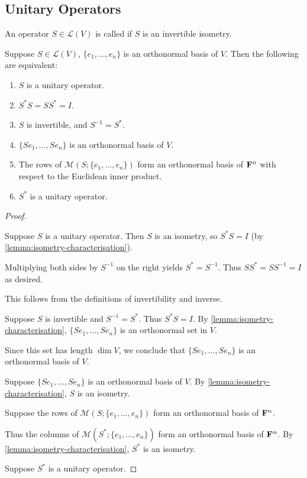 \subsection{Unitary Operators}
\begin{definition}
An operator $S\in\mathcal{L}(V)$ is called  if $S$ is an invertible isometry.
\end{definition}

\begin{lemma}\label{lemma:unitary-operator-characterisation}
Suppose $S\in\mathcal{L}(V)$, $\{e_1,\dots,e_n\}$ is an orthonormal basis of $V$. Then the following are equivalent:
\begin{enumerate}[label=(\roman*)]
\item $S$ is a unitary operator.
\item $S^*S=SS^*=I$.
\item $S$ is invertible, and $S^{-1}=S^*$.
\item $\{Se_1,\dots,Se_n\}$ is an orthonormal basis of $V$.
\item The rows of $\mathcal{M}(S;\{e_1,\dots,e_n\})$ form an orthonormal basis of $\mathbf F^n$ with respect to the Euclidean inner product.
\item $S^*$ is a unitary operator.
\end{enumerate}
\end{lemma}

\begin{proof} \

 Suppose $S$ is a unitary operator. Then $S$ is an isometry, so $S^*S=I$ (by \ref{lemma:isometry-characterisation}). 

Multiplying both sides by $S^{-1}$ on the right yields $S^*=S^{-1}$. Thus $SS^*=SS^{-1}=I$ as desired.

 This follows from the definitions of invertibility and inverse.

 Suppose $S$ is invertible and $S^{-1}=S^*$. Thus $S^*S=I$. By \ref{lemma:isometry-characterisation}, $\{Se_1,\dots,Se_n\}$ is an orthonormal set in $V$. 

Since this set has length $\dim V$, we conclude that $\{Se_1,\dots,Se_n\}$ is an orthonormal basis of $V$.

 Suppose $\{Se_1,\dots,Se_n\}$ is an orthonormal basis of $V$.
By \ref{lemma:isometry-characterisation}, $S$ is an isometry.



 Suppose the rows of $\mathcal{M}(S;\{e_1,\dots,e_n\})$ form an orthonormal basis of $\mathbf F^n$.

Thus the columns of $\mathcal{M}(S^*;\{e_1,\dots,e_n\})$ form an orthonormal basis of $\mathbf F^n$. By \ref{lemma:isometry-characterisation}, $S^*$ is an isometry.

 Suppose $S^*$ is a unitary operator. 
\end{proof}

